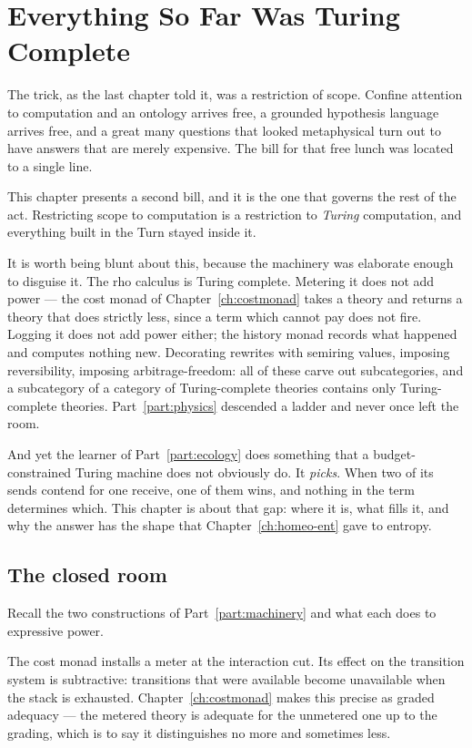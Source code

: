 \chapter{Everything So Far Was Turing Complete}
\label{ch:ent}

The trick, as the last chapter told it, was a restriction of scope.
Confine attention to computation and an ontology arrives free, a grounded
hypothesis language arrives free, and a great many questions that looked
metaphysical turn out to have answers that are merely expensive.
The bill for that free lunch was located to a single line.

This chapter presents a second bill, and it is the one that governs the
rest of the act.
Restricting scope to computation is a restriction to \emph{Turing}
computation, and everything built in the Turn stayed inside it.

It is worth being blunt about this, because the machinery was elaborate
enough to disguise it.
The rho calculus is Turing complete.
Metering it does not add power --- the cost monad of
Chapter~\ref{ch:costmonad} takes a theory and returns a theory that does
strictly less, since a term which cannot pay does not fire.
Logging it does not add power either; the history monad records what
happened and computes nothing new.
Decorating rewrites with semiring values, imposing reversibility,
imposing arbitrage-freedom: all of these carve out subcategories, and a
subcategory of a category of Turing-complete theories contains only
Turing-complete theories.
Part~\ref{part:physics} descended a ladder and never once left the room.

And yet the learner of Part~\ref{part:ecology} does something that a
budget-constrained Turing machine does not obviously do.
It \emph{picks}.
When two of its sends contend for one receive, one of them wins, and
nothing in the term determines which.
This chapter is about that gap: where it is, what fills it, and why the
answer has the shape that Chapter~\ref{ch:homeo-ent} gave to entropy.

\section{The closed room}

Recall the two constructions of Part~\ref{part:machinery} and what each
does to expressive power.

The cost monad installs a meter at the interaction cut.
Its effect on the transition system is subtractive: transitions that were
available become unavailable when the stack is exhausted.
Chapter~\ref{ch:costmonad} makes this precise as graded adequacy --- the
metered theory is adequate for the unmetered one up to the grading, which
is to say it distinguishes no more and sometimes less.

